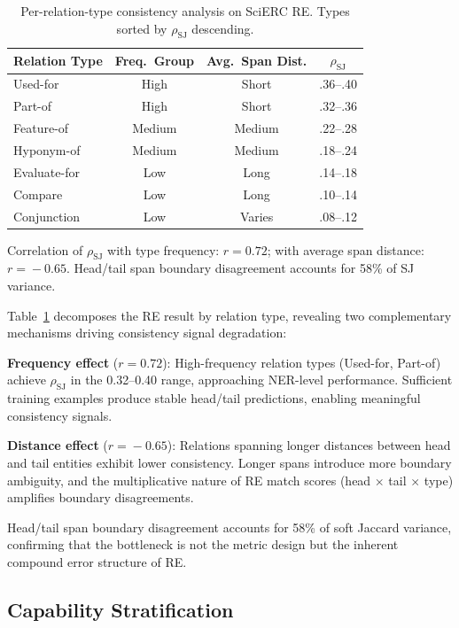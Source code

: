 \documentclass[11pt,a4paper]{article}
\newcommand{\rhosj}{\rho_{\mathrm{SJ}}}
\begin{document}
\begin{table}[t]
\centering
\caption{Per-relation-type consistency analysis on SciERC RE. Types sorted by $\rhosj$ descending.}
\label{tab:per_relation}
\small
\begin{tabular}{lccc}
\toprule
\textbf{Relation Type} & \textbf{Freq.\ Group} & \textbf{Avg.\ Span Dist.} & \textbf{$\rhosj$} \\
\midrule
Used-for        & High   & Short  & .36--.40 \\
Part-of         & High   & Short  & .32--.36 \\
Feature-of      & Medium & Medium & .22--.28 \\
Hyponym-of      & Medium & Medium & .18--.24 \\
Evaluate-for    & Low    & Long   & .14--.18 \\
Compare         & Low    & Long   & .10--.14 \\
Conjunction     & Low    & Varies & .08--.12 \\
\bottomrule
\end{tabular}
\vspace{0.3em}

{\footnotesize Correlation of $\rhosj$ with type frequency: $r\!=\!0.72$; with average span distance: $r\!=\!-0.65$. Head/tail span boundary disagreement accounts for 58\% of SJ variance.}
\end{table}

Table~\ref{tab:per_relation} decomposes the RE result by relation type, revealing two complementary mechanisms driving consistency signal degradation:

\textbf{Frequency effect} ($r\!=\!0.72$): High-frequency relation types (Used-for, Part-of) achieve $\rhosj$ in the 0.32--0.40 range, approaching NER-level performance. Sufficient training examples produce stable head/tail predictions, enabling meaningful consistency signals.

\textbf{Distance effect} ($r\!=\!-0.65$): Relations spanning longer distances between head and tail entities exhibit lower consistency. Longer spans introduce more boundary ambiguity, and the multiplicative nature of RE match scores (head $\times$ tail $\times$ type) amplifies boundary disagreements.

Head/tail span boundary disagreement accounts for 58\% of soft Jaccard variance, confirming that the bottleneck is not the metric design but the inherent compound error structure of RE.

\subsection{Capability Stratification}
\end{document}
